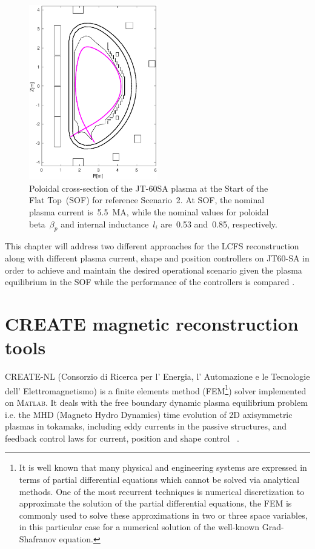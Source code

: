\begin{figure}[h]
	\centering
	\includegraphics[width=0.5\textwidth]{Chp3/scenario2_SOF.eps}
	
	\caption{Poloidal cross-section of the JT-60SA plasma at the Start of the Flat Top~(SOF) for reference Scenario~2. At SOF, the nominal plasma current is~5.5~MA, while the nominal values for poloidal beta~$\beta_p$ and internal inductance~$l_i$ are~0.53 and~0.85, respectively.	\label{SOF}}
\end{figure}



This chapter will address two different approaches for the LCFS reconstruction along  with different plasma current, shape and position controllers on  JT60-SA in order to achieve and maintain the desired operational scenario given the plasma equilibrium in the SOF while the performance of the controllers is compared .



\section{CREATE magnetic reconstruction tools}

CREATE-NL (Consorzio di Ricerca per l' Energia, l' Automazione e le Tecnologie dell' Elettromagnetismo) is a finite elements method (FEM\footnote{It is well known that many physical and engineering systems are expressed in terms of partial differential equations which cannot be solved via analytical methods. One of the most recurrent techniques is numerical discretization to approximate the solution of the partial differential equations, the FEM is commonly used to solve these approximations in two or three space variables, in this particular case for a numerical solution of the well-known Grad-Shafranov equation. }) solver implemented on \textsc{Matlab}. It deals with the free boundary dynamic plasma equilibrium problem i.e. the MHD (Magneto Hydro Dynamics) time evolution of 2D axisymmetric plasmas in tokamaks, including eddy currents in the passive structures, and feedback control laws for current, position and shape control ~\cite{Albanese:CREATENLnew}.
\smallskip

